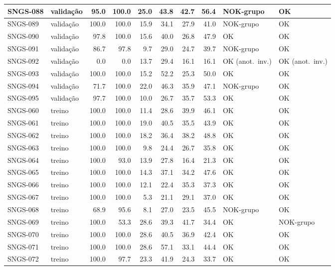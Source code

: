 \begin{small}
\begin{longtable}{|l|l|r|r|r|r|r|r|l|l|}
SNGS-088 & validação & 95.0 & 100.0 & 25.0 & 43.8 & 42.7 & 56.4 & NOK-grupo & OK \\ \hline
SNGS-089 & validação & 100.0 & 100.0 & 15.9 & 34.1 & 27.9 & 41.0 & NOK-grupo & OK \\ \hline
SNGS-090 & validação & 97.8 & 100.0 & 15.6 & 40.0 & 26.8 & 47.9 & OK & OK \\ \hline
SNGS-091 & validação & 86.7 & 97.8 & 9.7 & 29.0 & 24.7 & 39.7 & NOK-grupo & OK \\ \hline
SNGS-092 & validação & 0.0 & 0.0 & 13.7 & 29.4 & 16.1 & 16.1 & OK (anot.\ inv.) & OK (anot.\ inv.) \\ \hline
SNGS-093 & validação & 100.0 & 100.0 & 15.2 & 52.2 & 25.3 & 50.0 & OK & OK \\ \hline
SNGS-094 & validação & 71.7 & 100.0 & 22.0 & 46.3 & 35.9 & 47.1 & NOK-grupo & OK \\ \hline
SNGS-095 & validação & 97.7 & 100.0 & 10.0 & 26.7 & 35.7 & 53.3 & OK & OK \\ \hline
SNGS-060 & treino & 100.0 & 100.0 & 11.4 & 28.6 & 39.9 & 46.1 & OK & OK \\ \hline
SNGS-061 & treino & 100.0 & 100.0 & 19.0 & 40.5 & 35.5 & 43.9 & OK & OK \\ \hline
SNGS-062 & treino & 100.0 & 100.0 & 18.2 & 36.4 & 38.2 & 48.8 & OK & OK \\ \hline
SNGS-063 & treino & 100.0 & 100.0 & 9.8 & 24.4 & 26.7 & 35.8 & OK & OK \\ \hline
SNGS-064 & treino & 100.0 & 93.0 & 13.9 & 27.8 & 16.4 & 21.3 & OK & OK \\ \hline
SNGS-065 & treino & 100.0 & 100.0 & 14.3 & 37.1 & 34.2 & 47.6 & OK & OK \\ \hline
SNGS-066 & treino & 100.0 & 100.0 & 12.1 & 22.4 & 35.3 & 37.3 & OK & OK \\ \hline
SNGS-067 & treino & 100.0 & 100.0 & 5.3 & 21.1 & 29.1 & 37.0 & OK & OK \\ \hline
SNGS-068 & treino & 68.9 & 95.6 & 8.1 & 27.0 & 23.5 & 45.5 & NOK-grupo & OK \\ \hline
SNGS-069 & treino & 100.0 & 53.3 & 28.6 & 39.3 & 41.7 & 34.4 & OK & NOK-grupo \\ \hline
SNGS-070 & treino & 100.0 & 100.0 & 28.6 & 40.5 & 36.9 & 42.4 & OK & OK \\ \hline
SNGS-071 & treino & 100.0 & 100.0 & 28.6 & 57.1 & 33.1 & 44.4 & OK & OK \\ \hline
SNGS-072 & treino & 100.0 & 97.7 & 23.3 & 41.9 & 24.3 & 33.7 & OK & OK \\ \hline

\end{longtable}
\end{small}
